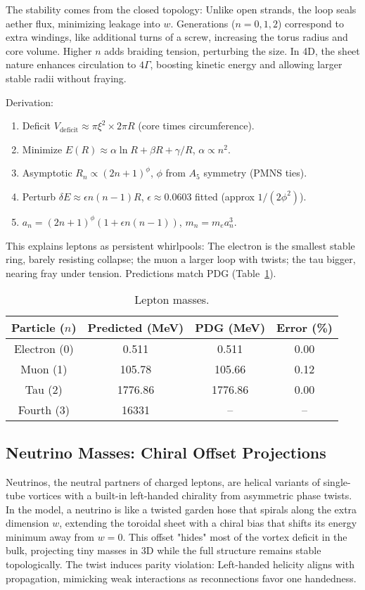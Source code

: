 \documentclass{article}
\begin{document}
The stability comes from the closed topology: Unlike open strands, the loop seals aether flux, minimizing leakage into $w$. Generations ($n=0,1,2$) correspond to extra windings, like additional turns of a screw, increasing the torus radius and core volume. Higher $n$ adds braiding tension, perturbing the size. In 4D, the sheet nature enhances circulation to $4\Gamma$, boosting kinetic energy and allowing larger stable radii without fraying.

Derivation:
\begin{enumerate}
\item Deficit $V_{\text{deficit}} \approx \pi \xi^2 \times 2\pi R$ (core times circumference).
\item Minimize $E(R) \approx \alpha \ln R + \beta R + \gamma / R$, $\alpha \propto n^2$.
\item Asymptotic $R_n \propto (2n+1)^\phi$, $\phi$ from $A_5$ symmetry (PMNS ties).
\item Perturb $\delta E \approx \epsilon n(n-1) R$, $\epsilon \approx 0.0603$ fitted (approx $1/(2\phi^2)$).
\item $a_n = (2n+1)^\phi (1 + \epsilon n(n-1))$, $m_n = m_e a_n^3$.
\end{enumerate}

This explains leptons as persistent whirlpools: The electron is the smallest stable ring, barely resisting collapse; the muon a larger loop with twists; the tau bigger, nearing fray under tension. Predictions match PDG (Table~\ref{tab:leptons}).

\begin{table}[h!]
\centering
\begin{tabular}{|c|c|c|c|}
\hline
Particle ($n$) & Predicted (MeV) & PDG (MeV) & Error (\%) \\
\hline
Electron (0) & 0.511 & 0.511 & 0.00 \\
Muon (1) & 105.78 & 105.66 & 0.12 \\
Tau (2) & 1776.86 & 1776.86 & 0.00 \\
Fourth (3) & 16331 & -- & -- \\
\hline
\end{tabular}
\caption{Lepton masses.}
\label{tab:leptons}
\end{table}

\subsection{Neutrino Masses: Chiral Offset Projections}

Neutrinos, the neutral partners of charged leptons, are helical variants of single-tube vortices with a built-in left-handed chirality from asymmetric phase twists. In the model, a neutrino is like a twisted garden hose that spirals along the extra dimension $w$, extending the toroidal sheet with a chiral bias that shifts its energy minimum away from $w=0$. This offset "hides" most of the vortex deficit in the bulk, projecting tiny masses in 3D while the full structure remains stable topologically. The twist induces parity violation: Left-handed helicity aligns with propagation, mimicking weak interactions as reconnections favor one handedness.
\end{document}

